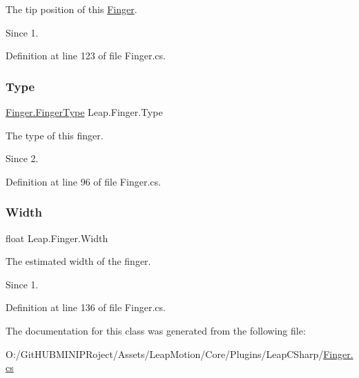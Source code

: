The tip position of this \mbox{\hyperlink{class_leap_1_1_finger}{Finger}}. 

\begin{DoxySince}{Since}
1. 
\end{DoxySince}


Definition at line 123 of file Finger.\+cs.

\mbox{\label{class_leap_1_1_finger_a86fc4ed5138e26ac07ec0885f3627126}} 
\subsubsection{\texorpdfstring{Type}{Type}}
{\footnotesize\ttfamily \mbox{\hyperlink{class_leap_1_1_finger_ae75e8d46a01aff0bd5c6d6fb99e2f2ba}{Finger.\+Finger\+Type}} Leap.\+Finger.\+Type}



The type of this finger. 

\begin{DoxySince}{Since}
2. 
\end{DoxySince}


Definition at line 96 of file Finger.\+cs.

\mbox{\label{class_leap_1_1_finger_a8e432d97bede775d87b8e2585f2b406f}} 
\subsubsection{\texorpdfstring{Width}{Width}}
{\footnotesize\ttfamily float Leap.\+Finger.\+Width}



The estimated width of the finger. 

\begin{DoxySince}{Since}
1. 
\end{DoxySince}


Definition at line 136 of file Finger.\+cs.



The documentation for this class was generated from the following file\+:\begin{DoxyCompactItemize}
\item 
O\+:/\+Git\+H\+U\+B\+M\+I\+N\+I\+P\+Roject/\+Assets/\+Leap\+Motion/\+Core/\+Plugins/\+Leap\+C\+Sharp/\mbox{\hyperlink{_finger_8cs}{Finger.\+cs}}\end{DoxyCompactItemize}
